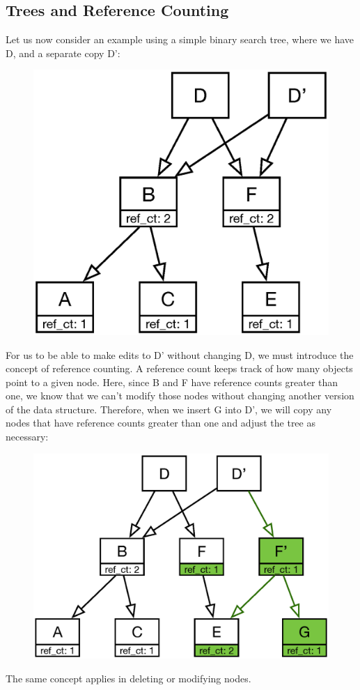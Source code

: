 \documentclass[preprint]{sigplanconf}
\begin{document}
\subsection{Trees and Reference Counting}
Let us now consider an example using a simple binary search tree, where we have D, and a separate copy D':
\begin{figure}[H]
\includegraphics[scale=.43]{treefig}
\centering
\end{figure}
For us to be able to make edits to D' without changing D, we must introduce the concept of reference counting.
A reference count keeps track of how many objects point to a given node.
Here, since B and F have reference counts greater than one, we know that we can't modify those nodes without changing another version of the data structure.
Therefore, when we insert G into D', we will copy any nodes that have reference counts greater than one and adjust the tree as necessary:
\begin{figure}[H]
\includegraphics[scale=.43]{treefig2}
\centering
\end{figure}
The same concept applies in deleting or modifying nodes.
\end{document}
